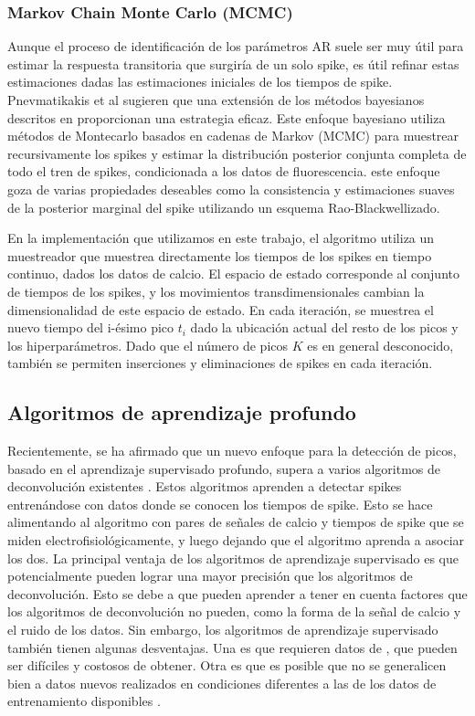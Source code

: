 \subsubsection{Markov Chain Monte Carlo (MCMC)}\label{sec:MCMC}

Aunque el proceso de identificación de los parámetros  AR suele ser muy útil para estimar la respuesta transitoria que surgiría de un solo spike, es útil refinar estas estimaciones dadas las estimaciones iniciales de los tiempos de spike. Pnevmatikakis et al \cite{pnevmatikakis_simultaneous_2016} sugieren  que una extensión de los métodos bayesianos descritos en \cite{pnevmatikakis_bayesian_2013} proporcionan una estrategia eficaz. Este  enfoque bayesiano utiliza métodos de Montecarlo basados en cadenas de Markov  (\gls{MCMC}) para muestrear recursivamente los spikes y estimar la distribución posterior conjunta completa de todo el tren de spikes, condicionada a los datos de fluorescencia.  este enfoque goza de varias propiedades  deseables como la consistencia y estimaciones suaves de la posterior marginal del spike utilizando un esquema Rao-Blackwellizado.   

En la implementación que utilizamos  en este trabajo, el algoritmo utiliza un muestreador que muestrea directamente los tiempos de los spikes en tiempo continuo, dados los datos de calcio.  El espacio de estado corresponde al conjunto de tiempos de los spikes, y los movimientos transdimensionales cambian la dimensionalidad de este espacio de estado. En cada iteración, se muestrea el nuevo tiempo del i-ésimo pico $t_i$ dado la ubicación actual del resto de los picos y los hiperparámetros. Dado que el número de picos $K$ es en general desconocido, también se permiten  inserciones y eliminaciones de spikes en cada iteración.


\subsection{Algoritmos de aprendizaje profundo}

Recientemente, se ha afirmado que un nuevo enfoque para la detección de picos, basado en el aprendizaje supervisado profundo, supera a varios algoritmos de deconvolución existentes \cite{theis_benchmarking_2016}. Estos algoritmos aprenden a detectar spikes entrenándose con datos donde se conocen los tiempos de spike. Esto se hace alimentando al algoritmo con pares de señales de calcio y tiempos de spike que se miden electrofisiológicamente, y luego dejando que el algoritmo aprenda a asociar los dos. La principal ventaja de los algoritmos de aprendizaje supervisado es que potencialmente pueden lograr una mayor precisión que los algoritmos de deconvolución. Esto se debe a que pueden aprender a tener en cuenta factores que los algoritmos de deconvolución no pueden, como la forma de la señal de calcio y el ruido de los datos. Sin embargo, los algoritmos de aprendizaje supervisado también tienen algunas desventajas. Una es que requieren datos de , que pueden ser difíciles y costosos de obtener. Otra es que es posible que no se generalicen bien a datos nuevos  realizados en condiciones diferentes a las de los datos de entrenamiento disponibles \cite{pachitariu_robustness_2018}.

